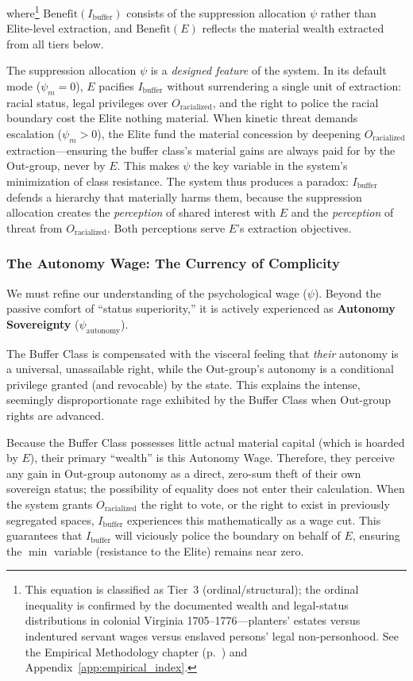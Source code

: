 where\footnote{This equation is classified as Tier~3 (ordinal/structural); the ordinal inequality is confirmed by the documented wealth and legal-status distributions in colonial Virginia 1705--1776---planters' estates versus indentured servant wages versus enslaved persons' legal non-personhood. See the Empirical Methodology chapter (p.~\pageref{ch:empirical_methodology}) and Appendix~\ref{app:empirical_index}.} $\text{Benefit}(I_{\text{buffer}})$ consists of the suppression allocation $\psi$ rather than Elite-level extraction, and $\text{Benefit}(E)$ reflects the material wealth extracted from all tiers below.

The suppression allocation $\psi$ is a \textit{designed feature} of the system. In its default mode ($\psi_m = 0$), $E$ pacifies $I_{\text{buffer}}$ without surrendering a single unit of extraction: racial status, legal privileges over $O_{\text{racialized}}$, and the right to police the racial boundary cost the Elite nothing material. When kinetic threat demands escalation ($\psi_m > 0$), the Elite fund the material concession by deepening $O_{\text{racialized}}$ extraction---ensuring the buffer class's material gains are always paid for by the Out-group, never by $E$. This makes $\psi$ the key variable in the system's minimization of class resistance. The system thus produces a paradox: $I_{\text{buffer}}$ defends a hierarchy that materially harms them, because the suppression allocation creates the \textit{perception} of shared interest with $E$ and the \textit{perception} of threat from $O_{\text{racialized}}$. Both perceptions serve $E$'s extraction objectives.

\subsubsection{The Autonomy Wage: The Currency of Complicity}

We must refine our understanding of the psychological wage ($\psi$). Beyond the passive comfort of ``status superiority,'' it is actively experienced as \textbf{Autonomy Sovereignty} ($\psi_{\text{autonomy}}$).

The Buffer Class is compensated with the visceral feeling that \textit{their} autonomy is a universal, unassailable right, while the Out-group's autonomy is a conditional privilege granted (and revocable) by the state. This explains the intense, seemingly disproportionate rage exhibited by the Buffer Class when Out-group rights are advanced. 

Because the Buffer Class possesses little actual material capital (which is hoarded by $E$), their primary ``wealth'' is this Autonomy Wage. Therefore, they perceive any gain in Out-group autonomy as a direct, zero-sum theft of their own sovereign status; the possibility of equality does not enter their calculation. When the system grants $O_{\text{racialized}}$ the right to vote, or the right to exist in previously segregated spaces, $I_{\text{buffer}}$ experiences this mathematically as a wage cut. This guarantees that $I_{\text{buffer}}$ will viciously police the boundary on behalf of $E$, ensuring the $\min$ variable (resistance to the Elite) remains near zero.

